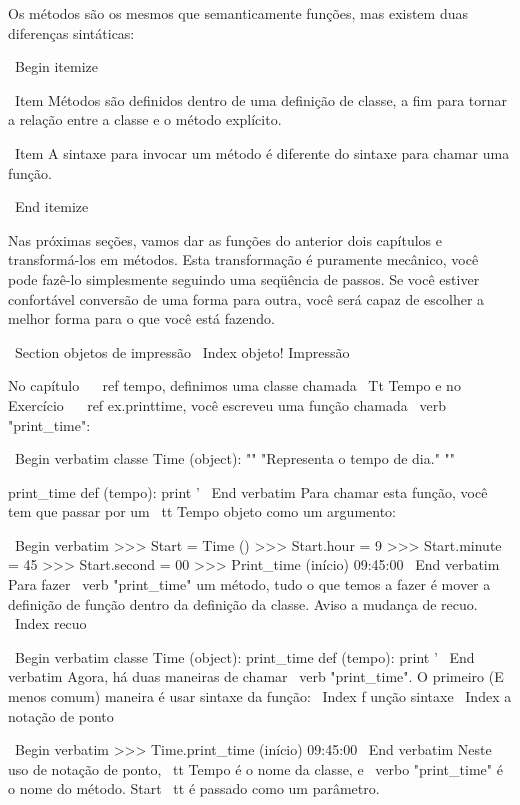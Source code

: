 \documentclass[10pt]{book}
\begin{document}
\begin {itemize}
{{{{{{{{{{{{{{Os métodos são os mesmos que semanticamente funções, mas existem
duas diferenças sintáticas:

\ Begin {itemize}

\ Item Métodos são definidos dentro de uma definição de classe, a fim
para tornar a relação entre a classe e o método explícito.

\ Item A sintaxe para invocar um método é diferente do
sintaxe para chamar uma função.

\ End {itemize}

Nas próximas seções, vamos dar as funções do anterior
dois capítulos e transformá-los em métodos. Esta transformação é
puramente mecânico, você pode fazê-lo simplesmente seguindo uma seqüência de
passos. Se você estiver confortável conversão de uma forma para outra,
você será capaz de escolher a melhor forma para o que você está fazendo.


\ Section {} objetos de impressão
\ Index {objeto! Impressão}

No capítulo ~ \ ref {tempo}, definimos uma classe chamada
{\ Tt} Tempo e no Exercício ~ \ ref {} ex.printtime, você 
escreveu uma função chamada \ verb "print_time":

\ Begin {verbatim}
classe Time (object):
    "" "Representa o tempo de dia." ""

print_time def (tempo):
    print '%
\ End {verbatim}
%
Para chamar esta função, você tem que passar por um {\ tt Tempo} objeto como um
argumento:

\ Begin {verbatim}
>>> Start = Time ()
>>> Start.hour = 9
>>> Start.minute = 45
>>> Start.second = 00
>>> Print_time (início)
09:45:00
\ End {verbatim}
%
Para fazer \ verb "print_time" um método, tudo o que temos a fazer é
mover a definição de função dentro da definição da classe. Aviso
a mudança de recuo.
\ Index {recuo}

\ Begin {verbatim}
classe Time (object):
    print_time def (tempo):
        print '%
\ End {verbatim}
%
Agora, há duas maneiras de chamar \ verb "print_time". O primeiro
(E menos comum) maneira é usar sintaxe da função:
\ Index {f unção sintaxe}
\ Index {} a notação de ponto


\ Begin {verbatim}
>>> Time.print_time (início)
09:45:00
\ End {verbatim}
%
Neste uso de notação de ponto, {\ tt Tempo} é o nome da classe,
e \ verbo "print_time" é o nome do método. {Start \ tt} é
passado como um parâmetro.

}}}}}}}}}}}}}}
\end{itemize}
\end{document}
